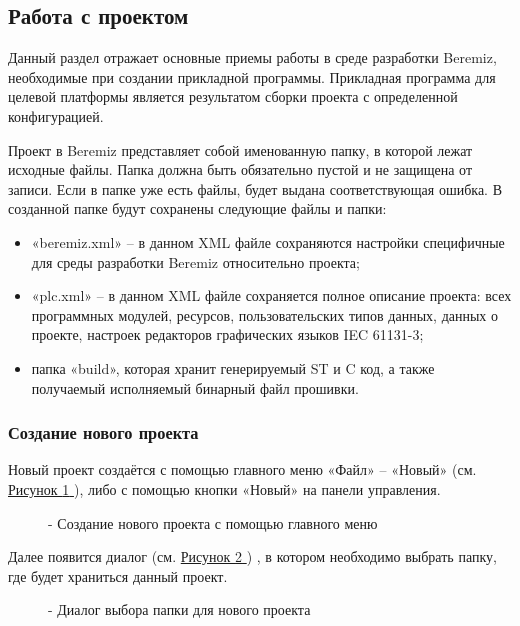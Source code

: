 \documentclass[letterpaper,10pt,russian]{sphinxmanual}
\begin{document}
\subsection{Работа с проектом}
\label{usage_guide/work_with_project::doc}\label{usage_guide/work_with_project:id1}
Данный раздел отражает основные приемы работы в среде разработки
Beremiz, необходимые при создании прикладной программы. Прикладная
программа для целевой платформы является результатом сборки проекта с
определенной конфигурацией.

Проект в Beremiz представляет собой именованную папку, в которой лежат
исходные файлы. Папка должна быть обязательно пустой и не защищена от
записи. Если в папке уже есть файлы, будет выдана соответствующая
ошибка. В созданной папке будут сохранены следующие файлы и папки:
\begin{itemize}
\item {} 
«beremiz.xml» – в данном XML файле сохраняются настройки специфичные
для среды разработки Beremiz относительно проекта;

\item {} 
«plc.xml» – в данном XML файле сохраняется полное описание проекта:
всех программных модулей, ресурсов, пользовательских типов данных,
данных о проекте, настроек редакторов графических языков IEC 61131-3;

\item {} 
папка «build», которая хранит генерируемый ST и C код, а также
получаемый исполняемый бинарный файл прошивки.

\end{itemize}


\subsubsection{Создание нового проекта}
\label{usage_guide/work_with_project:id2}
Новый проект создаётся с помощью главного меню «Файл» – «Новый»
(см. \hyperref[usage_guide/work_with_project:image144]{Рисунок \ref{usage_guide/work_with_project:image144} }), либо с помощью кнопки «Новый»
на панели управления.
\begin{figure}[htbp]
\centering
\capstart

\noindent{}
\caption{- Создание нового проекта с помощью главного меню}\label{usage_guide/work_with_project:image144}\end{figure}

Далее появится диалог (см. \hyperref[usage_guide/work_with_project:image145]{Рисунок \ref{usage_guide/work_with_project:image145} }) , в котором необходимо выбрать
папку, где будет храниться данный проект.
\begin{figure}[htbp]
\centering
\capstart

\noindent{}
\caption{- Диалог выбора папки для нового проекта}\label{usage_guide/work_with_project:image145}\end{figure}
\end{document}
